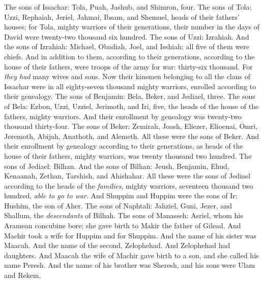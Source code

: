 \begin{biblechapter} %
 The sons of Issachar: Tola, Puah, Jashub, and Shimron, four.
\verse The sons of Tola: Uzzi, Rephaiah, Jeriel, Jahmai, Ibsam, and Shemuel, heads of their fathers’ houses; for Tola, mighty warriors of their generations, their number in the days of David were twenty-two thousand six hundred.
\verse The sons of Uzzi: Izrahiah. And the sons of Izrahiah: Michael, Obadiah, Joel, and Isshiah; all five of them were chiefs.
\verse And in addition to them, according to their generations, according to the house of their fathers, were troops of the army for war: thirty-six thousand. For \textit{they had} many wives and sons.
\verse Now their kinsmen belonging to all the clans of Issachar were in all eighty-seven thousand mighty warriors, enrolled according to their genealogy.
 The sons of Benjamin: Bela, Beker, and Jediael, three.
\verse The sons of Bela: Ezbon, Uzzi, Uzziel, Jerimoth, and Iri, five, the heads of the house of the fathers, mighty warriors. And their enrollment by genealogy was twenty-two thousand thirty-four.
\verse The sons of Beker: Zemirah, Joash, Eliezer, Elioenai, Omri, Jeremoth, Abijah, Anathoth, and Alemeth. All these were the sons of Beker.
\verse And their enrollment by genealogy according to their generations, as heads of the house of their fathers, mighty warriors, was twenty thousand two hundred.
\verse The sons of Jediael: Bilhan. And the sons of Bilhan: Jeush, Benjamin, Ehud, Kenaanah, Zethan, Tarshish, and Ahishahar.
\verse All these were the sons of Jediael according to the heads of the \textit{families}, mighty warriors, seventeen thousand two hundred, \textit{able to go to war}.
\verse And Shuppim and Huppim were the sons of Ir; Hushim, the son of Aher.
 The sons of Naphtali: Jahziel, Guni, Jezer, and Shallum, the \textit{descendants} of Bilhah.
 The sons of Manasseh: Asriel, whom his Aramean concubine bore; she gave birth to Makir the father of Gilead.
\verse And Machir took a wife for Huppim and for Shuppim. And the name of his sister was Maacah. And the name of the second, Zelophehad. And Zelophehad had daughters.
\verse And Maacah the wife of Machir gave birth to a son, and she called his name Peresh. And the name of his brother was Sheresh, and his sons were Ulam and Rekem.

\end{biblechapter}
